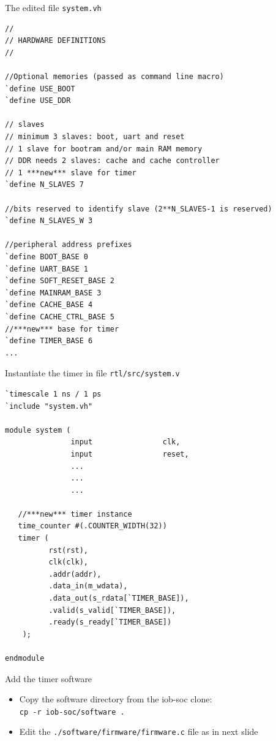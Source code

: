 \documentclass [xcolor=svgnames, t] {beamer}
\begin{document}
\begin{frame}[fragile]{The edited file {\tt system.vh}}
\begin{tiny}
\begin{lstlisting}
//
// HARDWARE DEFINITIONS
//

//Optional memories (passed as command line macro)
`define USE_BOOT
`define USE_DDR

// slaves
// minimum 3 slaves: boot, uart and reset
// 1 slave for bootram and/or main RAM memory
// DDR needs 2 slaves: cache and cache controller
// 1 ***new*** slave for timer
`define N_SLAVES 7

//bits reserved to identify slave (2**N_SLAVES-1 is reserved)
`define N_SLAVES_W 3

//peripheral address prefixes
`define BOOT_BASE 0
`define UART_BASE 1
`define SOFT_RESET_BASE 2
`define MAINRAM_BASE 3
`define CACHE_BASE 4
`define CACHE_CTRL_BASE 5
//***new*** base for timer
`define TIMER_BASE 6
...
\end{lstlisting}
\end{tiny}
\end{frame}

\begin{frame}[fragile]{Instantiate the timer in file {\tt rtl/src/system.v}}
\begin{tiny}
\begin{lstlisting}
`timescale 1 ns / 1 ps
`include "system.vh"

module system (
               input                clk,
               input                reset,
               ...
               ...
               ...

   //***new*** timer instance
   time_counter #(.COUNTER_WIDTH(32))
   timer (
          rst(rst),
          clk(clk),
          .addr(addr),
          .data_in(m_wdata),
          .data_out(s_rdata[`TIMER_BASE]),
          .valid(s_valid[`TIMER_BASE]),
          .ready(s_ready[`TIMER_BASE])
    );

endmodule

\end{lstlisting}
\end{tiny}
\end{frame}

\begin{frame}{Add the timer software}
\begin{itemize}
\item Copy the software directory from the iob-soc clone:
  \\{\tt cp -r iob-soc/software .}
\item Edit the {\tt ./software/firmware/firmware.c} file as in next slide\\
\end{itemize}
\end{frame}
\end{document}
